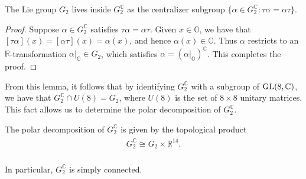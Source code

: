 \noindent\begin{lemma}\label{CompactSubgroup} The Lie group $G_2$ lives inside $G_2^\mathbb{C}$ as the centralizer subgroup $\{\alpha \in G_2^\mathbb{C} : \tau\alpha = \alpha\tau\}$.\\
\end{lemma}

\noindent\begin{proof} Suppose $\alpha \in G_2^\mathbb{C}$ satisfies $\tau\alpha = \alpha\tau$. Given $x \in \mathbb{O}$, we have that $[\tau\alpha](x) = [\alpha\tau](x) = \alpha(x)$, and hence $\alpha(x) \in \mathbb{O}$. Thus $\alpha$ restricts to an $\mathbb{R}$-transformation $\alpha\vert_\mathbb{O} \in G_2$, which satisfies $\alpha = (\alpha\vert_\mathbb{O})^\mathbb{C}$. This completes the proof.
\end{proof}\newpage

\noindent From this lemma, it follows that by identifying $G_2^\mathbb{C}$ with a subgroup of $\textup{GL}(8, \mathbb{C})$, we have that $G_2^\mathbb{C} \cap U(8) = G_2$, where $U(8)$ is the set of $8 \times 8$ unitary matrices. This fact allows us to determine the polar decomposition of $G_2^\mathbb{C}$.\\

\noindent\begin{theorem}\label{PolarDecomposition} The polar decomposition of $G_2^\mathbb{C}$ is given by the topological product
\begin{align*}
\begin{split}
G_2^\mathbb{C} \cong G_2 \times \mathbb{R}^{14}.
\end{split}
\end{align*}
\noindent\\[-1.25\linespacing] In particular, $G_2^\mathbb{C}$ is simply connected.\\
\end{theorem}


